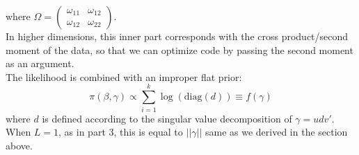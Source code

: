 \documentclass{article}
\begin{document}
where $\Omega = \begin{pmatrix} \omega_{11} & \omega_{12} \\ \omega_{12} & \omega_{22} \end{pmatrix}$.  
\\

In higher dimensions, this inner part corresponds with the cross product/second moment of the data, so that we can optimize code by passing the second moment as an argument.  
\\

The likelihood is combined with an improper flat prior:
\[
\pi(\beta, \gamma) \propto \sum_{i=1}^{k} \log(\text{diag}(d)) \equiv f(\gamma)
\]
where $d$ is defined according to the singular value decomposition of $\gamma = u d v'$.  When $L =1$, as in part 3, this is equal to $||\gamma ||$ same as we derived in the section above. 
\end{document}
